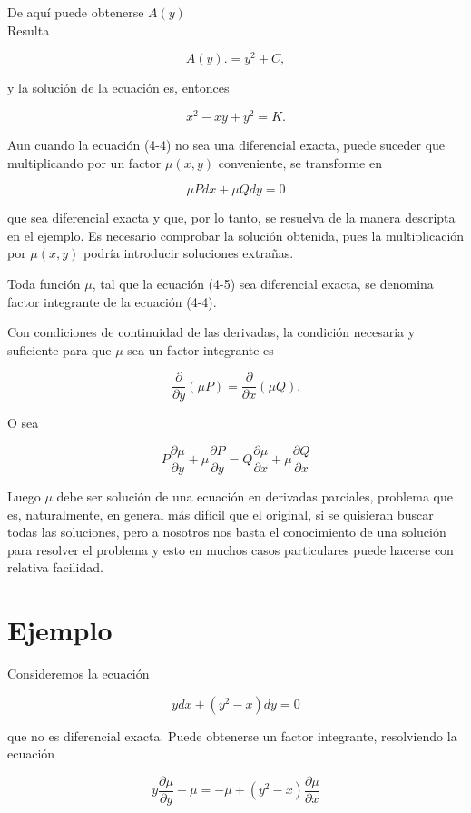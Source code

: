 \documentclass[10pt]{article}
\theoremstyle{plain}
\theoremstyle{definition}
\theoremstyle{remark}
\begin{document}
De aquí puede obtenerse $A(y)$\\
Resulta

$$
A(y) .=y^{2}+C,
$$

y la solución de la ecuación es, entonces

$$
x^{2}-x y+y^{2}=K .
$$

Aun cuando la ecuación (4-4) no sea una diferencial exacta, puede suceder que multiplicando por un factor $\mu(x, y)$ conveniente, se transforme en


\begin{equation*}
\mu P d x+\mu Q d y=0 \tag{$4\cdot5$}
\end{equation*}


que sea diferencial exacta y que, por lo tanto, se resuelva de la manera descripta en el ejemplo. Es necesario comprobar la solución obtenida, pues la multiplicación por $\mu(x, y)$ podría introducir soluciones extrañas.

Toda función $\mu$, tal que la ecuación (4-5) sea diferencial exacta, se denomina factor integrante de la ecuación (4-4).

Con condiciones de continuidad de las derivadas, la condición necesaria y suficiente para que $\mu$ sea un factor integrante es

$$
\frac{\partial}{\partial y}(\mu P)=\frac{\partial}{\partial x}(\mu Q) .
$$

O sea

$$
P \frac{\partial \mu}{\partial y}+\mu \frac{\partial P}{\partial y}=Q \frac{\partial \mu}{\partial x}+\mu \frac{\partial Q}{\partial x}
$$

Luego $\mu$ debe ser solución de una ecuación en derivadas parciales, problema que es, naturalmente, en general más difícil que el original, si se quisieran buscar todas las soluciones, pero a nosotros nos basta el conocimiento de una solución para resolver el problema y esto en muchos casos particulares puede hacerse con relativa facilidad.

\section*{Ejemplo}
Consideremos la ecuación

$$
y d x+\left(y^{2}-x\right) d y=0
$$

que no es diferencial exacta. Puede obtenerse un factor integrante, resolviendo la ecuación

$$
y \frac{\partial \mu}{\partial y}+\mu=-\mu+\left(y^{2}-x\right) \frac{\partial \mu}{\partial x}
$$
\end{document}
